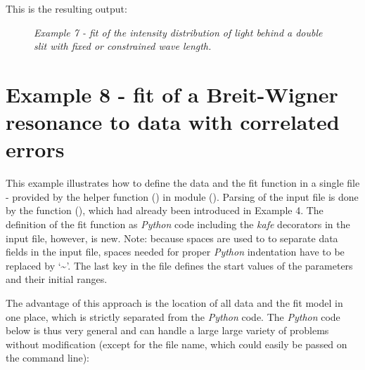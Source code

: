 \documentclass[a4paper,10pt,english]{sphinxmanual}
\begin{document}
This is the resulting output:
\begin{figure}[htbp]
\centering
\capstart

\caption{\emph{Example 7 - fit of the intensity distribution of light behind a double slit with fixed or constrained wave length.}}\end{figure}


\section{Example 8 - fit of a Breit-Wigner resonance to data with correlated errors}
\label{examples:example-8}\label{examples:example-8-fit-of-a-breit-wigner-resonance-to-data-with-correlated-errors}
This example illustrates how to define the data and the fit function
in a single file - provided by the helper function {\hyperref[module_doc:kafe.file_tools.buildFit_fromFile]{\emph{}}} ()
in module {\hyperref[module_doc:module-file_tools]{\emph{}}} (). Parsing of the input file is done by the
function {\hyperref[module_doc:kafe.file_tools.parse_general_inputfile]{\emph{}}} (), which had already been introduced
in Example 4. The definition of the fit function as \emph{Python} code
including the \emph{kafe} decorators in the input file, however, is new.
Note: because spaces are used to to separate data  fields in the
input file, spaces needed for proper \emph{Python} indentation have to be
replaced by `\textasciitilde{}'. The last key in the file defines the start values
of the parameters and their initial ranges.

The advantage of this approach is the location of all data
and the fit model in one place, which is strictly separated
from the \emph{Python} code. The \emph{Python} code below is thus very general
and can handle a large large variety of problems without
modification (except for the file name, which could easily be
passed on the command line):
\end{document}
